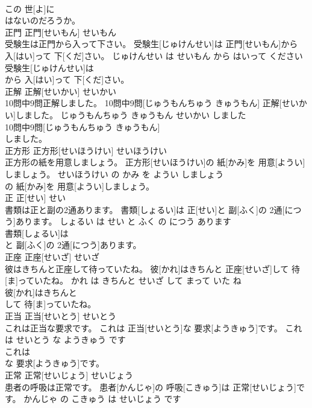 \documentclass[8pt]{extreport}
\begin{document}
\begin{CJK}{UTF8}{min}
\\	この 世[よ]に
\\	はないのだろうか。			
\\	正門	正門[せいもん]	せいもん	
\\	受験生は正門から入って下さい。	受験生[じゅけんせい]は 正門[せいもん]から 入[はい]って 下[くだ]さい。	じゅけんせい は せいもん から はいって ください	
\\	受験生[じゅけんせい]は
\\	から 入[はい]って 下[くだ]さい。			
\\	正解	正解[せいかい]	せいかい	
\\	10問中9問正解しました。	10問中9問[じゅうもんちゅう きゅうもん] 正解[せいかい]しました。	じゅうもんちゅう きゅうもん せいかい しました	
\\	10問中9問[じゅうもんちゅう きゅうもん]
\\	しました。			
\\	正方形	正方形[せいほうけい]	せいほうけい	
\\	正方形の紙を用意しましょう。	正方形[せいほうけい]の 紙[かみ]を 用意[ようい]しましょう。	せいほうけい の かみ を ようい しましょう	
\\	の 紙[かみ]を 用意[ようい]しましょう。			
\\	正	正[せい]	せい	
\\	書類は正と副の2通あります。	書類[しょるい]は 正[せい]と 副[ふく]の 2通[につう]あります。	しょるい は せい と ふく の につう あります	
\\	書類[しょるい]は
\\	と 副[ふく]の 2通[につう]あります。			
\\	正座	正座[せいざ]	せいざ	
\\	彼はきちんと正座して待っていたね。	彼[かれ]はきちんと 正座[せいざ]して 待[ま]っていたね。	かれ は きちんと せいざ して まって いた ね	
\\	彼[かれ]はきちんと
\\	して 待[ま]っていたね。			
\\	正当	正当[せいとう]	せいとう	
\\	これは正当な要求です。	これは 正当[せいとう]な 要求[ようきゅう]です。	これ は せいとう な ようきゅう です	
\\	これは
\\	な 要求[ようきゅう]です。			
\\	正常	正常[せいじょう]	せいじょう	
\\	患者の呼吸は正常です。	患者[かんじゃ]の 呼吸[こきゅう]は 正常[せいじょう]です。	かんじゃ の こきゅう は せいじょう です	

\end{CJK}
\end{document}
